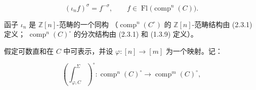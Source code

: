 \begin{equation*}
  (\iota_nf)^\sigma=f^{-\sigma},
  \qquad f\in\operatorname{Fl}\bigl(\operatorname{comp}^{n}(C)\bigr).
\end{equation*}

函子 $\iota_n$ 是 $\mathbb Z[n]$-范畴的一个同构
（$\operatorname{comp}^{n}(C^\circ)$ 的 $\mathbb Z[n]$-范畴结构由 (2.3.1) 定义；
$\operatorname{comp}^{n}(C)^\circ$ 的分次结构由 (2.3.1) 和 (1.3.9) 定义）。

假定可数直和在 $C$ 中可表示，并设
$\varphi\colon[n]\longrightarrow[m]$ 为一个映射。记：

\begin{equation}
  \left(\int_{\varphi,C}^{\Sigma}\right)^\circ\colon
  \operatorname{comp}^{n}(C)^\circ
  \longrightarrow
  \operatorname{comp}^{m}(C)^\circ,
  \tag{2.4.1.3}
\end{equation}
